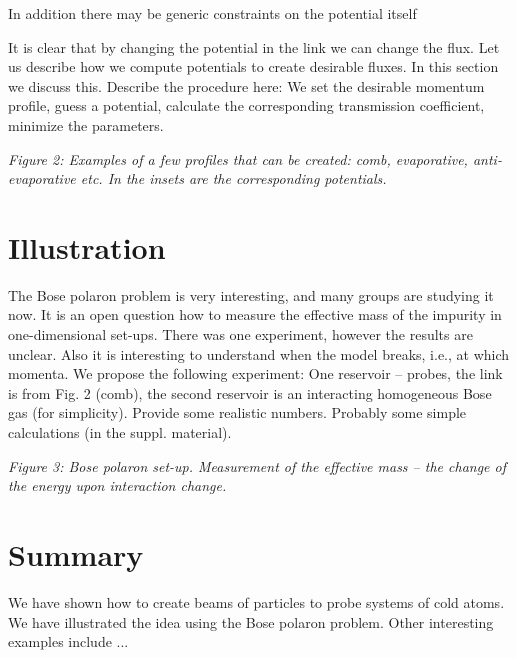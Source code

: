 \documentclass[onecolumn,amsmath,amssymb,nofootinbib,prl]{revtex4-1}
\begin{document}
In addition there may be generic constraints on the potential itself 

 It is clear that by changing the potential in the link we can change the flux. Let us describe how we compute potentials to create desirable fluxes. In this section we discuss this.  Describe the procedure here: We set the desirable momentum profile, guess a potential, calculate the corresponding transmission coefficient, minimize the parameters. 

{\it Figure 2: Examples of a few profiles that can be created: comb, evaporative, anti-evaporative etc. In the insets are the corresponding potentials.}

\section{Illustration}

The Bose polaron problem is very interesting, and many groups are studying it now. It is an open question how to measure the effective mass of the impurity in one-dimensional set-ups. There was one experiment, however the results are unclear. Also it is interesting to understand when the model breaks, i.e., at which momenta. We propose the following experiment: One reservoir -- probes, the link is from Fig. 2 (comb), the second reservoir is an interacting homogeneous Bose gas (for simplicity). Provide some realistic numbers. Probably some simple calculations (in the suppl. material). 

{\it Figure 3: Bose polaron set-up. Measurement of the effective mass -- the change of the energy upon interaction change.}


\section{Summary} 

We have shown how to create beams of particles to probe systems of cold atoms. We have illustrated the idea using the Bose polaron problem. Other interesting examples include ... 






 
\end{document}
